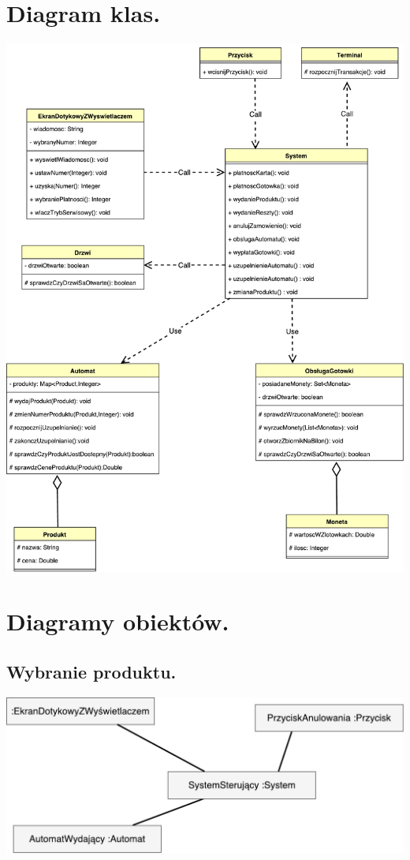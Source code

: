 \documentclass[11pt]{article}
\begin{document}
	\section{Diagram klas.}
		\begin{center}
			\includegraphics[scale=0.65]{klas.pdf}
		\end{center}
	\section{Diagramy obiektów.}
		\subsection{Wybranie produktu.}
		\begin{center}
			\includegraphics[scale=0.65]{obiektow1.pdf}
		\end{center}
\end{document}
